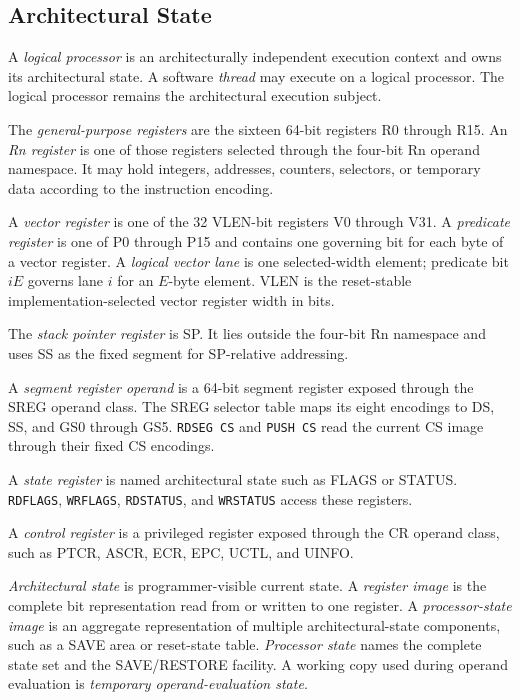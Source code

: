 \subsection{Architectural State}\label{section:architectural-state-terminology}

A \emph{logical processor} is an architecturally independent execution context and owns its architectural state.
A software \emph{thread} may execute on a logical processor. The logical processor remains the architectural
execution subject.

The \emph{general-purpose registers} are the sixteen 64-bit registers R0 through R15. An \emph{Rn register} is one
of those registers selected through the four-bit Rn operand namespace. It may hold integers, addresses, counters,
selectors, or temporary data according to the instruction encoding.

A \emph{vector register} is one of the 32 VLEN-bit registers V0 through V31.
A \emph{predicate register} is one of P0 through P15 and contains one
governing bit for each byte of a vector register. A \emph{logical vector lane}
is one selected-width element; predicate bit $iE$ governs lane $i$ for an
$E$-byte element. VLEN is the reset-stable implementation-selected vector
register width in bits.

The \emph{stack pointer register} is SP. It lies outside the four-bit Rn namespace and uses SS as the fixed segment
for SP-relative addressing.

A \emph{segment register operand} is a 64-bit segment register exposed through the SREG operand class. The SREG selector
table maps its eight encodings to DS, SS, and GS0 through GS5. \texttt{RDSEG CS} and \texttt{PUSH CS} read the
current CS image through their fixed CS encodings.

A \emph{state register} is named architectural state such as FLAGS or STATUS. \texttt{RDFLAGS}, \texttt{WRFLAGS},
\texttt{RDSTATUS}, and \texttt{WRSTATUS} access these registers.

A \emph{control register} is a privileged register exposed through the CR operand class, such as PTCR, ASCR, ECR,
EPC, UCTL, and UINFO.

\emph{Architectural state} is programmer-visible current state. A \emph{register image} is the complete bit
representation read from or written to one register. A \emph{processor-state image} is an aggregate representation
of multiple architectural-state components, such as a SAVE area or reset-state table. \emph{Processor state} names
the complete state set and the SAVE/RESTORE facility. A working copy used during operand evaluation is
\emph{temporary operand-evaluation state}.

